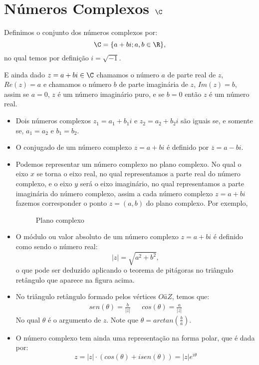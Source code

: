  \chapter{Números Complexos {$\C$}}
 
 \vskip0.3cm
 \colorbox{azul}{
 \begin{minipage}{14.5cm}
 \begin{center}
  Definimos o conjunto dos números complexos por:
 \[\C= \{a + bi; a, b \in \R \} ,\]
 no qual temos por definição $i= \sqrt{-1}$. 
 \end{center}
 \end{minipage}}
 \vskip0.3cm
 
 E ainda dado $z= a+bi \in \C$ chamamos o número $a$ de parte real de $z$, $Re(z)= a$ e chamamos o número $b$ de parte imaginária de $z$, $Im(z)= b$, assim se $a=0$, $z$ é um número imaginário puro, e se $b=0$ então $z$ é um número real.
 
 \begin{defi}
 \begin{itemize}
 \item Dois números complexos $z_1= a_1 + b_1i$ e $z_2= a_2 + b_2i$ são iguais se, e somente se, $a_1=a_2$ e $b_1= b_2$.
 \item O conjugado de um número complexo $z= a+bi$ é definido por $\overline{z}= a - bi$.
 \item Podemos representar um número complexo no plano complexo. No qual o eixo $x$ se torna o eixo real, no qual representamos a parte real do número complexo, e o eixo $y$ será o eixo imaginário, no qual representamos a parte imaginária do número complexo, assim a cada número complexo $z= a+bi$ fazemos corresponder o ponto $z= (a, b)$ do plano complexo. Por exemplo,
 
 \begin{figure}[H]
   \centering
   \caption{Plano complexo}
  \end{figure}
 
 \item O módulo ou valor absoluto de um número complexo $z= a+bi$ é definido como sendo o número real:
 \[|z|= \sqrt{a^2 + b^2},\]
 o que pode ser deduzido aplicando o teorema de pitágoras no triângulo retângulo que aparece na figura acima.
 \item No triângulo retângulo formado pelos vértices $O\hat{a}Z$, temos que:
  \begin{align*}
 & sen(\theta)= \frac{b}{|z|} & & cos(\theta)= \frac{a}{|z|} &
 \end{align*}
 No qual $\theta$ é o argumento de $z$. Note que $\theta= arctan \left( \frac{b}{a} \right)$.
 
 \item O número complexo tem ainda uma representação na forma polar, que é dada por:
 \[z= |z|\cdot (cos(\theta) + i sen(\theta))= |z| e^{i \theta} \]
 
 \end{itemize}
 \end{defi}
 
